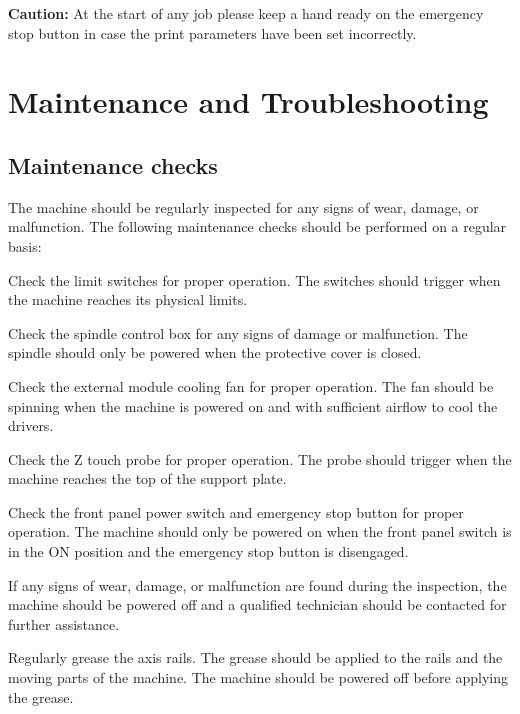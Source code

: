 \documentclass[11pt, openright]{book}
\begin{document}
    \begin{dent}{\textbf{Caution:}}
        At the start of any job please keep a hand ready on the emergency stop button in case the print parameters have been set incorrectly.
    \end{dent}    


    




 \section{Maintenance and Troubleshooting}

    \subsection{Maintenance checks}

    The machine should be regularly inspected for any signs of wear, damage, or malfunction. The following maintenance checks should be performed on a regular basis:

    \begin{items}[-3pt]{-15pt}{-15pt}
        \item Check the limit switches for proper operation. The switches should trigger when the machine reaches its physical limits.
        \item Check the spindle control box for any signs of damage or malfunction. The spindle should only be powered when the protective cover is closed.
        \item Check the external module cooling fan for proper operation. The fan should be spinning when the machine is powered on and with sufficient airflow to cool the drivers.
        \item Check the Z touch probe for proper operation. The probe should trigger when the machine reaches the top of the support plate.
        \item Check the front panel power switch and emergency stop button for proper operation. The machine should only be powered on when the front panel switch is in the ON position and the emergency stop button is disengaged.
    \end{items}

    If any signs of wear, damage, or malfunction are found during the inspection, the machine should be powered off and a qualified technician should be contacted for further assistance.

    Regularly grease the axis rails. The grease should be applied to the rails and the moving parts of the machine. The machine should be powered off before applying the grease.
\end{document}

